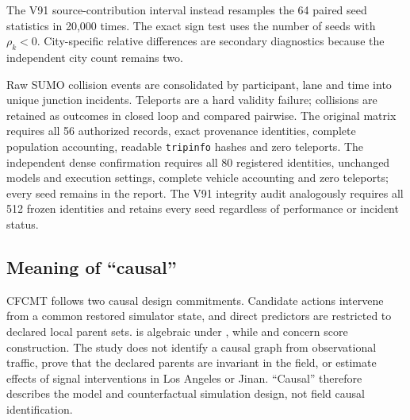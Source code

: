The V91 source-contribution interval instead resamples the 64 paired seed
statistics in  20,000 times.  The exact sign test
uses the number of seeds with $\rho_k<0$.  City-specific relative differences
are secondary diagnostics because the independent city count remains two.

Raw SUMO collision events are consolidated by participant, lane and time into
unique junction incidents.  Teleports are a hard validity failure; collisions
are retained as outcomes in closed loop and compared pairwise.  The original
matrix requires all 56 authorized records, exact provenance identities, complete
population accounting, readable \texttt{tripinfo} hashes and zero teleports.
The independent dense confirmation requires all 80 registered identities,
unchanged models and execution settings, complete vehicle accounting and zero
teleports; every seed remains in the report.  The V91 integrity audit
analogously requires all 512 frozen identities and
retains every seed regardless of performance or incident status.

\subsection{Meaning of ``causal''}

CFCMT follows two causal design commitments.  Candidate actions intervene
from a common restored simulator state, and direct predictors are restricted
to declared local parent sets.   is algebraic under
, while 
and  concern score construction.  The
study does not identify a causal graph from observational traffic, prove that
the declared parents are invariant in the field, or estimate effects of signal
interventions in Los Angeles or Jinan.  ``Causal'' therefore describes the
model and counterfactual simulation design, not field causal identification.
